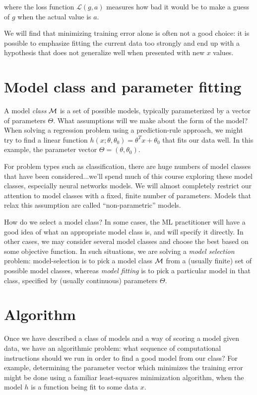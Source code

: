where the loss function $\mathcal{L}(g, a)$ measures how bad it would be to make a guess of $g$ when the actual value is $a$.

We will find that minimizing training error alone is often not a good
choice: it is possible to emphasize fitting the current data too
strongly and end up with a hypothesis that does not generalize well
when presented with new $x$ values.


\section{Model class and parameter fitting}\label{modelClass}

A model {\em class} ${\cal M}$ is a set of possible models, typically  parameterized by a vector of parameters $\Theta$.
What assumptions will we make about the form of the model?  When
solving a regression problem using a prediction-rule approach, we
might try to find a linear function $h(x ; \theta, \theta_0) = \theta^T x + \theta_0$
that fits our data well.  In this example, the parameter vector
$\Theta = (\theta, \theta_0)$.

For problem types such as classification, there
are huge numbers of model classes that have been considered...we'll
spend much of this course exploring these model classes, especially
neural networks models.
We will almost completely restrict our attention to model classes with
a fixed, finite number of parameters.  Models that
relax this assumption are called ``non-parametric'' models.

How do we select a model class?  In some cases, the ML
practitioner will have a good idea of what an appropriate model class
is, and will specify it directly.  In other cases, we may consider
several model classes and choose the best based on some objective function.  In such situations, we are solving a {\em
    model selection} problem: model-selection is to pick a model class
${\cal M}$ from a (usually finite) set of possible model classes, whereas {\em
    model fitting} is to pick a particular model in that class,
specified by (usually continuous) parameters $\Theta$.

\section{Algorithm}
Once we have described a class of models and a way of scoring a model
given data, we have an algorithmic problem: what sequence of
computational instructions should we run in order to find a good model
from our class?  For example, determining the parameter vector which minimizes the training error might be done using a
familiar least-squares minimization algorithm, when the model $h$ is a
function being fit to some data $x$.

